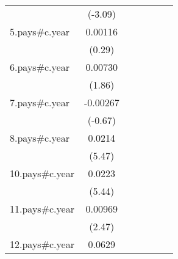{\begin{tabular}{l*{6}{c}}
                    &     (-3.09)         &                     &                     &                     &                     &                     \\
[1em]
5.pays#c.year       &     0.00116         &                     &                     &                     &                     &                     \\
                    &      (0.29)         &                     &                     &                     &                     &                     \\
[1em]
6.pays#c.year       &     0.00730         &                     &                     &                     &                     &                     \\
                    &      (1.86)         &                     &                     &                     &                     &                     \\
[1em]
7.pays#c.year       &    -0.00267         &                     &                     &                     &                     &                     \\
                    &     (-0.67)         &                     &                     &                     &                     &                     \\
[1em]
8.pays#c.year       &      0.0214\sym{***}&                     &                     &                     &                     &                     \\
                    &      (5.47)         &                     &                     &                     &                     &                     \\
[1em]
10.pays#c.year      &      0.0223\sym{***}&                     &                     &                     &                     &                     \\
                    &      (5.44)         &                     &                     &                     &                     &                     \\
[1em]
11.pays#c.year      &     0.00969\sym{*}  &                     &                     &                     &                     &                     \\
                    &      (2.47)         &                     &                     &                     &                     &                     \\
[1em]
12.pays#c.year      &      0.0629\sym{***}&                     &                     &                     &                     &                     \\

\end{tabular}}
